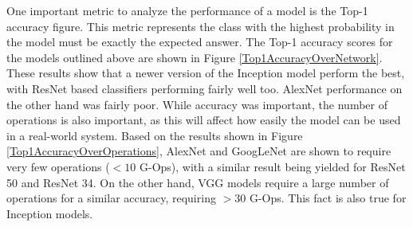 \documentclass[10pt,a4paper]{article}
\begin{document}
            One important metric to analyze the performance of a model is the Top-1 accuracy figure. This metric represents the class with the highest probability in the model must be exactly the expected answer. 
            The Top-1 accuracy scores for the models outlined above are shown in Figure \ref{Top1AccuracyOverNetwork}. These results show that a newer version of the Inception model perform the best,
            with ResNet based classifiers performing fairly well too. AlexNet performance on the other hand was fairly poor. While accuracy was important, the number of operations is also important, as this will affect how easily the model can be used 
            in a real-world system. Based on the results shown in Figure \ref{Top1AccuracyOverOperations}, AlexNet and GoogLeNet are shown to require very few operations ($<10$ G-Ops),
            with a similar result being yielded for ResNet 50 and ResNet 34. On the other hand, VGG models require a large number of operations for a similar accuracy, requiring $>30$ G-Ops.
            This fact is also true for Inception models.
\end{document}
